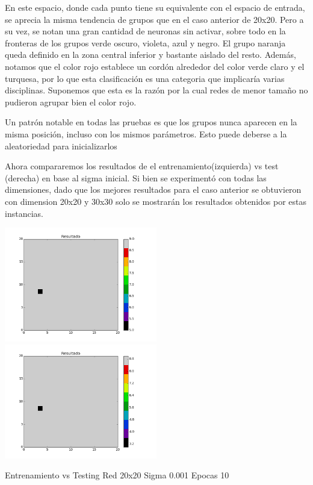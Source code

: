 En este espacio, donde cada punto tiene su equivalente con el espacio de entrada, se aprecia la misma tendencia de grupos que en el caso anterior de 20x20. Pero a su vez, se notan una gran cantidad de neuronas sin activar, sobre todo en la fronteras de los grupos verde oscuro, violeta, azul y negro. El grupo naranja queda definido en la zona central inferior y bastante aislado del resto. Adem\'as, notamos que el color rojo establece un cord\'on alrededor del color verde claro y el turquesa, por lo que esta clasificaci\'on es una categoria que implicar\'ia varias disciplinas. Suponemos que esta es la raz\'on por la cual redes de menor tama\~no no pudieron agrupar bien el color rojo.

Un patr\'on notable en todas las pruebas es que los grupos nunca aparecen en la misma posici\'on, incluso con los mismos par\'ametros. Esto puede deberse a la aleatoriedad para inicializarlos

Ahora compararemos los resultados de el entrenamiento(izquierda) vs test (derecha) en base al sigma inicial. Si bien se experiment\'o con todas las dimensiones, dado que los mejores resultados para el caso anterior se obtuvieron con dimension 20x20 y 30x30 solo se mostrar\'an los resultados obtenidos por estas instancias.


\includegraphics[width=0.5\textwidth]{img/EJ2_Sigma/train_M_20_sigma_0_001_epocas_5}
\includegraphics[width=0.5\textwidth]{img/EJ2_Sigma/test_M_20_sigma_0_001_epocas_5}
{\center \footnotesize Entrenamiento vs Testing Red 20x20 Sigma 0.001 Epocas 10\par}

